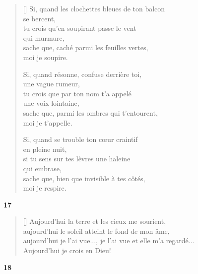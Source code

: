 \documentclass[a4paper,12pt]{book}
\begin{document}
\begin{verse}[\versewidth]
  Si, quand les clochettes bleues de ton balcon \\
  se bercent, \\
  tu crois qu'en soupirant passe le vent \\
  qui murmure, \\
  sache que, caché parmi les feuilles vertes, \\
  moi je soupire.

  Si, quand résonne, confuse derrière toi, \\
  une vague rumeur, \\
  tu crois que par ton nom t'a appelé \\
  une voix lointaine, \\
  sache que, parmi les ombres qui t'entourent, \\
  moi je t'appelle.

  Si, quand se trouble ton cœur craintif \\
  en pleine nuit, \\
  si tu sens sur tes lèvres une haleine \\
  qui embrase, \\
  sache que, bien que invisible à tes côtés, \\
  moi je respire.
\end{verse}

\bigskip

\begin{center}
  \textbf{17}
\end{center}

\settowidth{\versewidth}{aujourd'hui je l'ai vue..., je l'ai vue et elle m'a regardé...}

\begin{verse}[\versewidth]
  Aujourd'hui la terre et les cieux me sourient, \\
  aujourd'hui le soleil atteint le fond de mon âme, \\
  aujourd'hui je l'ai vue..., je l'ai vue et elle m'a regardé... \\
  Aujourd'hui je crois en Dieu!
\end{verse}

\bigskip

\begin{center}
  \textbf{18}
\end{center}
\end{document}
